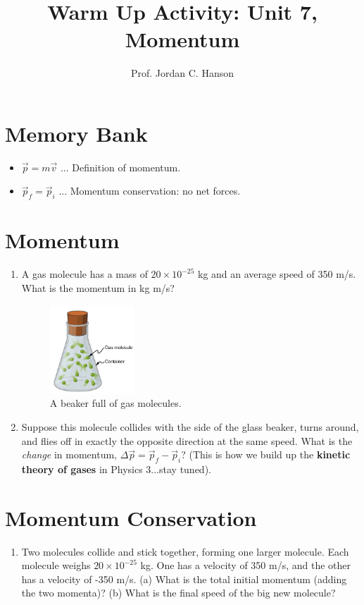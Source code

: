 \documentclass{article}
\begin{document}
\title{Warm Up Activity: Unit 7, Momentum}
\author{Prof. Jordan C. Hanson}

\maketitle

\section{Memory Bank}

\begin{itemize}
\item $\vec{p} = m \vec{v}$ ... Definition of momentum.
\item $\vec{p}_f = \vec{p}_i$ ... Momentum conservation: no net forces.
\end{itemize}

\section{Momentum}

\begin{enumerate}
\item A gas molecule has a mass of $20 \times 10^{-25}$ kg and an average speed of 350 m/s.  What is the momentum in kg m/s? \\ \vspace{1cm}
\begin{figure}[ht]
\centering
\includegraphics[width=0.3\textwidth]{gas.png}
\caption{\label{fig:gas} A beaker full of gas molecules.}
\end{figure}
\item Suppose this molecule collides with the side of the glass beaker, turns around, and flies off in exactly the opposite direction at the same speed.  What is the \textit{change} in momentum, $\Delta \vec{p} = \vec{p}_f - \vec{p}_i$?  (This is how we build up the \textbf{kinetic theory of gases} in Physics 3...stay tuned). \\ \vspace{1cm}
\end{enumerate}

\section{Momentum Conservation}
\begin{enumerate}
\item Two molecules collide and stick together, forming one larger molecule.  Each molecule weighs $20 \times 10^{-25}$ kg.  One has a velocity of 350 m/s, and the other has a velocity of -350 m/s.  (a) What is the total initial momentum (adding the two momenta)? (b) What is the final speed of the big new molecule?
\end{enumerate}
\end{document}
